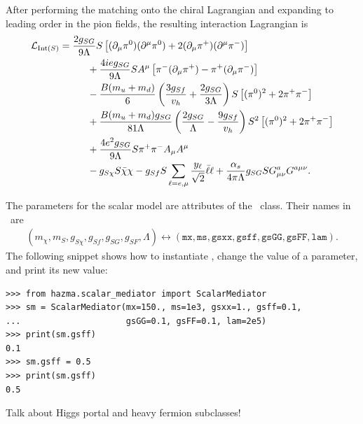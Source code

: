 After performing the matching onto the chiral Lagrangian and expanding to leading order in the pion fields, the resulting interaction Lagrangian is
\begin{align}
    \mathcal{L}_{\mathrm{Int}(S)} &= \frac{2 g_{SG}}{9 \Lambda} S \left[ (\partial_\mu \pi^0) (\partial^\mu \pi^0) + 2 (\partial_\mu \pi^+) (\partial^\mu \pi^-) \right]\\
                         &\hspace{1cm} + \frac{4 i e g_{SG}}{9 \Lambda} S A^\mu \left[ \pi^- (\partial_\mu \pi^+) - \pi^+ (\partial_\mu \pi^-) \right]\\
                         &\hspace{1cm} - \frac{B (m_u + m_d)}{6} \left( \frac{3 g_{Sf}}{v_h} + \frac{2 g_{SG}}{3 \Lambda} \right) S \left[ (\pi^0)^2 + 2 \pi^+ \pi^- \right]\\
                         &\hspace{1cm} + \frac{B (m_u + m_d) g_{SG}}{81 \Lambda} \left( \frac{2 g_{SG}}{\Lambda} - \frac{9 g_{Sf}}{v_h} \right) S^2 \left[ (\pi^0)^2 + 2 \pi^+ \pi^- \right]\\
                         &\hspace{1cm} + \frac{4 e^2 g_{SG}}{9\Lambda} S \pi^+ \pi^- A_\mu A^\mu\\
                         &\hspace{1cm} - g_{S \chi} S \bar{\chi} \chi - g_{Sf} S \sum_{\ell=e,\mu} \frac{y_\ell}{\sqrt{2}} \bar{\ell} \ell + \frac{\alpha_s}{4\pi \Lambda} g_{SG} S G_{\mu\nu}^a G^{a \mu\nu}.
\end{align}

The parameters for the scalar model are attributes of the \sm\ class. Their names in \hazma\ are
\begin{align*}
    (m_\chi, m_S, g_{S\chi}, g_{Sf}, g_{SG}, g_{SF}, \Lambda) \leftrightarrow (\mathtt{mx}, \mathtt{ms}, \mathtt{gsxx}, \mathtt{gsff}, \mathtt{gsGG}, \mathtt{gsFF}, \mathtt{lam}).
\end{align*}
The following snippet shows how to instantiate \sm, change the value of a parameter, and print its new value:
\begin{verbatim}
>>> from hazma.scalar_mediator import ScalarMediator
>>> sm = ScalarMediator(mx=150., ms=1e3, gsxx=1., gsff=0.1,
...                     gsGG=0.1, gsFF=0.1, lam=2e5)
>>> print(sm.gsff)
0.1
>>> sm.gsff = 0.5
>>> print(sm.gsff)
0.5
\end{verbatim}

{\color{red} Talk about Higgs portal and heavy fermion subclasses!}

